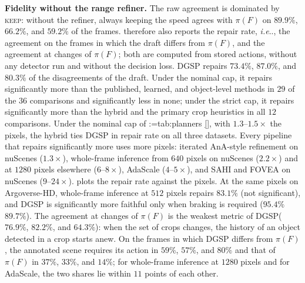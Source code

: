 \documentclass[10pt,letterpaper]{article}
\makeatletter
\DeclareRobustCommand\onedot{\futurelet\@let@token\@onedot}
\def\@onedot{\ifx\@let@token.\else.\null\fi\xspace}
\def\ie{\emph{i.e}\onedot} \def\Ie{\emph{I.e}\onedot}
\newcommand{\method}{DGSP\xspace}
\newcommand{\full}{F}
\newcommand{\policy}{\pi}
\theoremstyle{remark}
\theoremstyle{plain}
\theoremstyle{definition}
\DeclareRobustCommand{\mref}[1]{\def\mref@list{}\@for\mref@i:=#1\do{\ifx\mref@list\@empty\edef\mref@list{M-\mref@i}\else\edef\mref@list{\mref@list,M-\mref@i}\fi}%
  \edef\mref@cmd{\noexpand\cref*{\mref@list}}\mref@cmd}
\makeatother
\begin{document}
\noindent\textbf{Fidelity without the range refiner.}
The raw agreement is dominated by \textsc{keep}: without the refiner, always keeping the speed agrees with $\policy(\full)$ on $89.9\%$, $66.2\%$, and $59.2\%$ of the frames.
 therefore also reports the repair rate, \ie, the agreement on the frames in which the draft differs from $\policy(\full)$, and the agreement at changes of $\policy(\full)$; both are computed from stored actions, without any detector run and without the decision loss.
\method repairs $73.4\%$, $87.0\%$, and $80.3\%$ of the disagreements of the draft.
Under the nominal cap, it repairs significantly more than the published, learned, and object-level methods in $29$ of the $36$ comparisons and significantly less in none; under the strict cap, it repairs significantly more than the hybrid and the primary crop heuristics in all $12$ comparisons.
Under the nominal cap of \mref{tab:planners}, with $1.3$--$1.5\times$ the pixels, the hybrid ties \method in repair rate on all three datasets.
Every pipeline that repairs significantly more uses more pixels: iterated AnA-style refinement on nuScenes ($1.3\times$), whole-frame inference from $640$ pixels on nuScenes ($2.2\times$) and at $1280$ pixels elsewhere ($6$--$8\times$), AdaScale ($4$--$5\times$), and SAHI and FOVEA on nuScenes ($9$--$24\times$).
 plots the repair rate against the pixels.
At the same pixels on Argoverse-HD, whole-frame inference at $512$ pixels repairs $83.1\%$ (not significant), and \method is significantly more faithful only when braking is required ($95.4\%$ \vs $89.7\%$).
The agreement at changes of $\policy(\full)$ is the weakest metric of \method ($76.9\%$, $82.2\%$, and $64.3\%$): when the set of crops changes, the history of an object detected in a crop starts anew.
On the frames in which \method differs from $\policy(\full)$, the annotated scene requires its action in $59\%$, $57\%$, and $80\%$ and that of $\policy(\full)$ in $37\%$, $33\%$, and $14\%$; for whole-frame inference at $1280$ pixels and for AdaScale, the two shares lie within $11$ points of each other.
\end{document}
